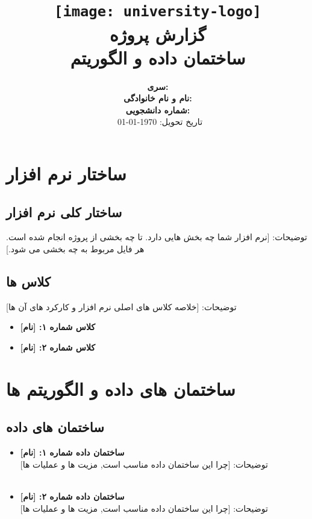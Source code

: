\documentclass[12pt]{article}
\title{
	\vspace*{-2cm}
	\texttt{[image: university-logo]}\\
	\vspace{1cm}
	\textcolor{primary}{\bfseries گزارش پروژه}\\
	\Huge ساختمان داده و الگوریتم
}
\author{
	\large
	\textbf{سری:} \hrulefill \\
	\vspace{0.5cm}
	\textbf{نام و نام خانوادگی:} \hrulefill \\
	\vspace{0.5cm}
	\textbf{شماره دانشجویی:} \hrulefill \\
	\vspace{1cm}
	\textcolor{primary}{\faCalendar\ تاریخ تحویل: \today}
}
\date{}
\begin{document}
	
	\maketitle
	\thispagestyle{empty}
	
	\newpage
	\renewcommand{\contentsname}{\textcolor{primary}{فهرست مطالب}}
	\tableofcontents
	\newpage
	
	
	\section{ساختار نرم افزار}
	\subsection{ساختار کلی نرم افزار}
	توضیحات: [نرم افزار شما چه بخش هایی دارد. تا چه بخشی از پروژه انجام شده است. هر فایل مربوط به چه بخشی می شود.]
	\subsection{کلاس ها}
	توضیحات: [خلاصه کلاس های اصلی نرم افزار و کارکرد های آن ها]
	\begin{itemize}[noitemsep]
		\item \textbf{کلاس شماره ۱: [نام]}\\
		\lipsum[8]
		\item \textbf{کلاس شماره ۲: [نام]}\\
		\lipsum[8]
		
	\end{itemize}
	\newpage
	\section{ساختمان های داده و الگوریتم ها}
\subsection{ساختمان های داده}
\begin{itemize}[noitemsep]
	\item \textbf{ساختمان داده شماره ۱: [نام]}\\
	توضیحات: [چرا این ساختمان داده مناسب است, مزیت ها و عملیات ها]\\
	\lipsum[8]
	\\
	\item \textbf{ساختمان داده شماره ۲: [نام]}\\
	توضیحات: [چرا این ساختمان داده مناسب است, مزیت ها و عملیات ها]\\
	\lipsum[8]
\end{itemize}
\end{document}
